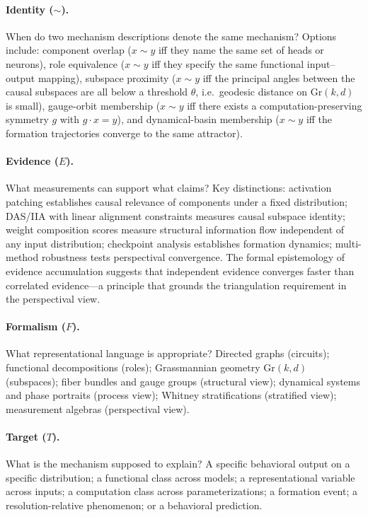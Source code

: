 \documentclass[11pt]{article}
\theoremstyle{remark}
\newcommand{\Gr}{\mathrm{Gr}}
\begin{document}
\paragraph{Identity ($\sim$).}
When do two mechanism descriptions denote the same mechanism?  Options
include: component overlap ($x \sim y$ iff they name the same set of
heads or neurons), role equivalence ($x \sim y$ iff they specify the
same functional input--output mapping), subspace proximity ($x \sim y$
iff the principal angles between the causal subspaces are all below a
threshold $\theta$, i.e.\ geodesic distance on $\Gr(k,d)$ is small),
gauge-orbit membership ($x \sim y$ iff there exists a computation-preserving
symmetry $g$ with $g \cdot x = y$), and dynamical-basin membership
($x \sim y$ iff the formation trajectories converge to the same
attractor).

\paragraph{Evidence ($E$).}
What measurements can support what claims?  Key distinctions: activation
patching establishes causal relevance of components under a fixed
distribution; DAS/IIA with linear alignment constraints measures causal
subspace identity; weight composition scores measure structural
information flow independent of any input distribution; checkpoint
analysis establishes formation dynamics; multi-method robustness tests
perspectival convergence.  The formal epistemology of evidence
accumulation \citep{earman1992,howson1989} suggests that independent
evidence converges faster than correlated evidence---a principle that
grounds the triangulation requirement in the perspectival view.

\paragraph{Formalism ($F$).}
What representational language is appropriate?  Directed graphs (circuits);
functional decompositions (roles); Grassmannian geometry $\Gr(k,d)$
(subspaces); fiber bundles and gauge groups (structural view); dynamical
systems and phase portraits (process view); Whitney stratifications
(stratified view); measurement algebras (perspectival view).

\paragraph{Target ($T$).}
What is the mechanism supposed to explain?  A specific behavioral output
on a specific distribution; a functional class across models; a
representational variable across inputs; a computation class across
parameterizations; a formation event; a resolution-relative phenomenon;
or a behavioral prediction.
\end{document}
